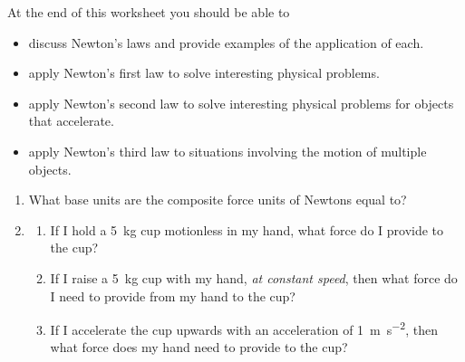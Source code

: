 At the end of this worksheet you should be able to  

\begin{itemize}
	\item discuss Newton's laws and provide examples of the application of each.
	\item apply Newton's first law to solve interesting physical problems.
	\item apply Newton's second law to solve interesting physical problems for objects that accelerate.
	\item apply Newton's third law to situations involving the motion of multiple objects. 


\end{itemize}


\begin{enumerate}
\setlength\itemsep{1 in}


\item What base units are the composite force units of Newtons equal to?





\item
\begin{enumerate}
\item If I hold a \SI{5}{\kilogram} cup motionless in my hand, what force do I provide to the cup?\hugeskip
\item If I raise a \SI{5}{\kilogram} cup with my hand, \emph{at constant speed}, then what force do I need to provide from my hand to the cup?\hugeskip
\item If I accelerate the cup upwards with an acceleration of \SI{+1}{\meter \per \second^2}, then what force does my hand need to provide to the cup?\hugeskip


\end{enumerate}
\end{enumerate}
